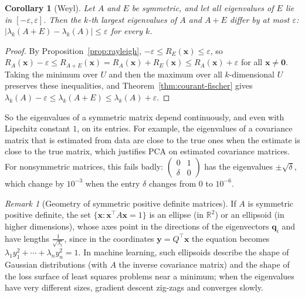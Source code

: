 \documentclass[11pt]{article}
\theoremstyle{definition}
\theoremstyle{plain}
\newtheorem{corollary}[definition]{Corollary}
\theoremstyle{remark}
\newtheorem{remark}[definition]{Remark}
\begin{document}
\begin{corollary}[Weyl]\label{cor:weyl}
    Let $A$ and $E$ be symmetric, and let all eigenvalues of $E$ lie in $[-\varepsilon, \varepsilon]$. Then the $k$-th largest eigenvalues of $A$ and $A + E$ differ by at most $\varepsilon$: $|\lambda_k(A + E) - \lambda_k(A)| \leq \varepsilon$ for every $k$.
\end{corollary}

\begin{proof}
    By Proposition~\ref{prop:rayleigh}, $-\varepsilon \leq R_E(\mathbf{x}) \leq \varepsilon$, so $R_A(\mathbf{x}) - \varepsilon \leq R_{A+E}(\mathbf{x}) = R_A(\mathbf{x}) + R_E(\mathbf{x}) \leq R_A(\mathbf{x}) + \varepsilon$ for all $\mathbf{x} \neq \mathbf{0}$. Taking the minimum over $U$ and then the maximum over all $k$-dimensional $U$ preserves these inequalities, and Theorem~\ref{thm:courant-fischer} gives $\lambda_k(A) - \varepsilon \leq \lambda_k(A + E) \leq \lambda_k(A) + \varepsilon$.
\end{proof}

So the eigenvalues of a symmetric matrix depend continuously, and even with Lipschitz constant $1$, on its entries. For example, the eigenvalues of a covariance matrix that is estimated from data are close to the true ones when the estimate is close to the true matrix, which justifies PCA on estimated covariance matrices. For nonsymmetric matrices, this fails badly: $\begin{pmatrix} 0 & 1 \\ \delta & 0 \end{pmatrix}$ has the eigenvalues $\pm\sqrt{\delta}$, which change by $10^{-3}$ when the entry $\delta$ changes from $0$ to $10^{-6}$.

\begin{remark}[Geometry of symmetric positive definite matrices]
    If $A$ is symmetric positive definite, the set $\{\mathbf{x} : \mathbf{x}^\top A \mathbf{x} = 1\}$ is an ellipse (in $\mathbb{R}^2$) or an ellipsoid (in higher dimensions), whose axes point in the directions of the eigenvectors $\mathbf{q}_i$ and have lengths $\frac{1}{\sqrt{\lambda_i}}$, since in the coordinates $\mathbf{y} = Q^\top \mathbf{x}$ the equation becomes $\lambda_1 y_1^2 + \cdots + \lambda_n y_n^2 = 1$. In machine learning, such ellipsoids describe the shape of Gaussian distributions (with $A$ the inverse covariance matrix) and the shape of the loss surface of least squares problems near a minimum; when the eigenvalues have very different sizes, gradient descent zig-zags and converges slowly.
\end{remark}
\end{document}
